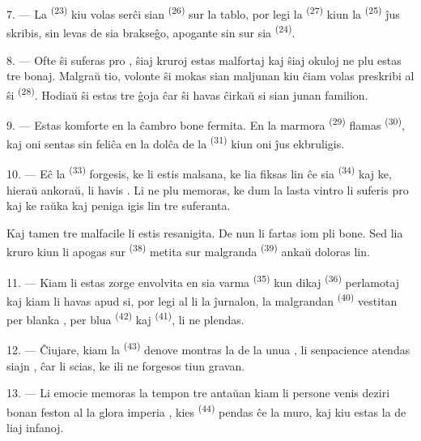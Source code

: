 7. --- La  \textsuperscript{(23)} kiu volas serĉi sian
 \textsuperscript{(26)} sur la tablo, por legi la
 \textsuperscript{(27)} kiun la 
\textsuperscript{(25)} ĵus skribis, sin levas de sia brakseĝo, apogante sin sur
sia  \textsuperscript{(24)}.

8. --- Ofte ŝi suferas pro , ŝiaj kruroj estas malfortaj kaj ŝiaj okuloj ne plu estas tre
bonaj. Malgraŭ tio, volonte ŝi mokas sian maljunan  kiu
ĉiam volas preskribi al ŝi  \textsuperscript{(28)}. Hodiaŭ ŝi
estas tre ĝoja ĉar ŝi havas ĉirkaŭ si sian junan familion.

9. --- Estas komforte en la ĉambro bone fermita. En la marmora 
\textsuperscript{(29)} flamas  \textsuperscript{(30)}, kaj
oni sentas sin feliĉa en la dolĉa  de la 
\textsuperscript{(31)} kiun oni ĵus ekbruligis.

\VUsaut{4.2mm}
\VUsaut{3.0mm}

10. --- Eĉ la  \textsuperscript{(33)} forgesis, ke li estis
malsana, ke lia  fiksas lin ĉe sia 
\textsuperscript{(34)} kaj ke, hieraŭ ankoraŭ, li havis . Li ne plu memoras, ke dum la lasta vintro li suferis pro
 kaj ke raŭka kaj peniga  igis lin tre
suferanta.

Kaj tamen tre malfacile li estis resanigita. De nun li fartas iom pli bone. Sed
lia kruro kiun li apogas sur  \textsuperscript{(38)} metita sur
malgranda  \textsuperscript{(39)} ankaŭ doloras lin.

11. --- Kiam li estas zorge envolvita en sia varma 
\textsuperscript{(35)} kun dikaj  \textsuperscript{(36)}
perlamotaj kaj kiam li havas apud si, por legi al li la ĵurnalon, la
malgrandan  \textsuperscript{(40)} vestitan per blanka
, per blua  \textsuperscript{(42)} kaj
 \textsuperscript{(41)}, li ne plendas.

12. --- Ĉiujare, kiam la  \textsuperscript{(43)} denove
montras la  de la unua , li senpacience atendas
siajn , ĉar li scias, ke ili ne forgesos tiun 
gravan.

13. --- Li emocie memoras la tempon tre antaŭan kiam li persone venis deziri
bonan feston al la glora imperia , kies 
\textsuperscript{(44)} pendas ĉe la muro, kaj kiu estas la  de
liaj infanoj.
\VUsaut{6.0mm}
\VUfilet{22mm}
